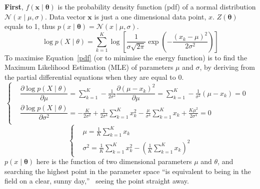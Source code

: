\documentclass[11pt,twoside,a4paper]{article}
\begin{document}
	\textbf{First}, $f(\mathbf{x} \mid \mathbf{\theta} )$ is the probability density function (pdf) of a normal distribution $\mathcal{N}(x \mid \mu, \sigma )$.
	Data vector $ \mathbf{x} $ is just a one dimensional data point, $x$.
	$ Z( \mathbf{\theta}) $ equals to 1, thus $p(x \mid \mathbf{\theta} ) = \mathcal{N}(x \mid \mu, \sigma )$.
	\begin{equation}
	\log p(X \mid \theta ) =  \sum_{k=1}^K \log [\frac{1}{\sigma \sqrt{2\pi}} \exp(-\frac{(x_k-\mu)^{2}}{2\sigma^{2}})]
	\label{pdf}
	\end{equation}
	To maximise Equation~\ref{pdf} (or to minimise the energy function) is to find the Maximum Likelihood Estimation (MLE) of parameters $ \mu $ and $ \sigma $, by deriving from the partial differential equations when they are equal to 0. 
	\begin{equation}
	\left\{
	\begin{aligned}
	   &\dfrac{\partial  \log p(X \mid \theta ) }{\partial \mu}= \sum_{k=1}^K -\frac{1}{2\sigma^{2}}\dfrac{\partial (\mu-x_k)^{2}}{\partial \mu} = \sum_{k=1}^K -\frac{1}{\sigma^{2}}(\mu-x_k) = 0 \quad\\
	   &\dfrac{\partial  \log p(X \mid \theta ) }{\partial \sigma^{2}}= -\frac{K}{2\sigma^{2}}+\frac{1}{2\sigma^{4}}\sum_{k=1}^K x_k^{2} -\frac{\mu}{\sigma^{4}}\sum_{k=1}^K x_k + \frac{K\mu^{2}}{2\sigma^{4}} = 0 \quad\\
	\end{aligned}
	\right.
	\end{equation}
	\begin{equation}
	\left\{
	\begin{aligned}
	    &\mu= \frac{1}{K}\sum_{k=1}^K x_k  \quad\\
	    &\sigma^{2} = \frac{1}{K}\sum_{k=1}^K x_k^{2} - (\frac{1}{K}\sum_{k=1}^K x_k)^{2}
	\end{aligned}
	\right.
	\end{equation}
	$p(x\mid \mathbf{\theta} )$ here is the function of two dimensional parameters $\mu$ and $\theta$, and searching the highest point in the parameter space ``is equivalent to being in the field on a clear, sunny day,''~\cite{woodfordnotes} seeing the point straight away.
	
\end{document}
